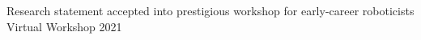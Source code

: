 
\begin{cvhonors}
  {Research statement accepted into prestigious workshop for early-career
  roboticists}
  {Virtual Workshop}
  {2021}
\end{cvhonors}
